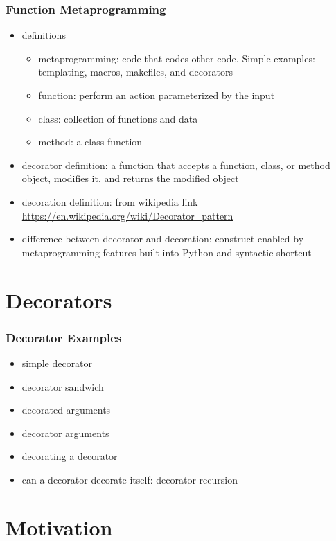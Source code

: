 \documentclass{beamer}
\begin{document}
\begin{frame}
\frametitle{Function Metaprogramming}
\begin{itemize}
  \item{definitions}
    \begin{itemize}
      \item{metaprogramming: code that codes other code.  Simple examples: templating, macros, makefiles, and decorators}
      \item{function: perform an action parameterized by the input}
      \item{class: collection of functions and data}
      \item{method: a class function}
    \end{itemize}
  \item{decorator definition: a function that accepts a function, class, or method object, modifies it, and returns the modified object}
  \item{decoration definition: from wikipedia link \url{https://en.wikipedia.org/wiki/Decorator_pattern}}
  \item{difference between decorator and decoration: construct enabled by metaprogramming features built into Python and syntactic shortcut}
\end{itemize}
\end{frame}

\section{Decorators}

\begin{frame}
\frametitle{Decorator Examples}
\begin{itemize}
  \item{simple decorator}
  \item{decorator sandwich}
  \item{decorated arguments}
  \item{decorator arguments}
  \item{decorating a decorator}
  \item{can a decorator decorate itself: decorator recursion}
\end{itemize}
\end{frame}

\section{Motivation}
\end{document}
